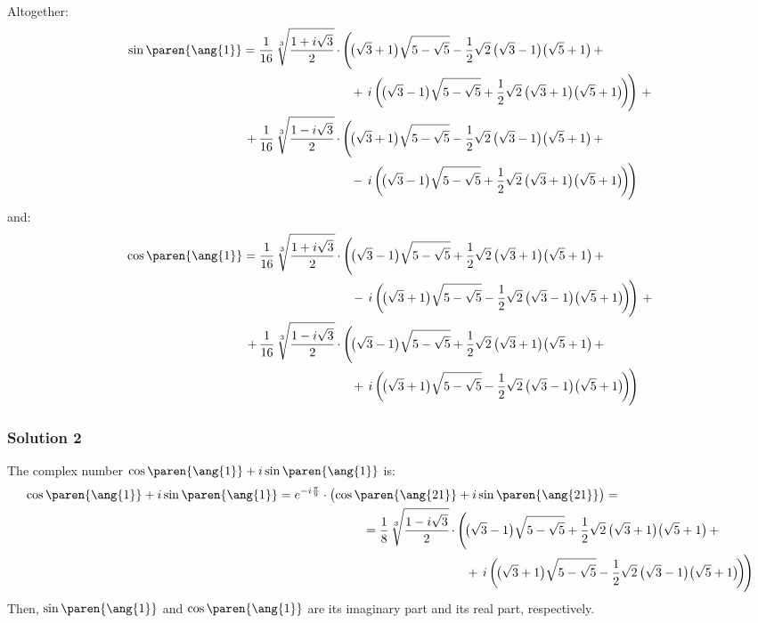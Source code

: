Altogether:
\begin{align*}
 \sin\paren{\ang{1}}
 = \frac{1}{16} \, \sqrt[3]{\frac{1 + i \sqrt{3}}{2}}
 \, \cdot \,
   &\Bigg( \!
     \big( \sqrt{3} + 1 \big) \sqrt{5 - \sqrt{5}}
     - \frac{1}{2} \sqrt{2} \, \big( \sqrt{3} - 1 \big) \big( \sqrt{5} + 1 \big) \, +
   \\
   &\,\,\,\,
     + \, i \, \bigg( \!
     \big( \sqrt{3} - 1 \big) \sqrt{5 - \sqrt{5}}
     + \frac{1}{2} \sqrt{2} \, \big( \sqrt{3} + 1 \big) \big( \sqrt{5} + 1 \big) \!
     \bigg) \!
   \Bigg) \,\, +
 \\
 + \, \frac{1}{16} \, \sqrt[3]{\frac{1 - i \sqrt{3}}{2}}
 \, \cdot \,
   &\Bigg( \!
     \big( \sqrt{3} + 1 \big) \sqrt{5 - \sqrt{5}}
     - \frac{1}{2} \sqrt{2} \, \big( \sqrt{3} - 1 \big) \big( \sqrt{5} + 1 \big) \, +
   \\
   &\,\,\,\,
     - \, i \, \bigg( \!
     \big( \sqrt{3} - 1 \big) \sqrt{5 - \sqrt{5}}
     + \frac{1}{2} \sqrt{2} \, \big( \sqrt{3} + 1 \big) \big( \sqrt{5} + 1 \big) \!
     \bigg) \!
   \Bigg)
\end{align*}
and:
\begin{align*}
 \cos\paren{\ang{1}}
 = \frac{1}{16} \, \sqrt[3]{\frac{1 + i \sqrt{3}}{2}}
 \, \cdot \,
   &\Bigg( \!
     \big( \sqrt{3} - 1 \big) \sqrt{5 - \sqrt{5}}
     + \frac{1}{2} \sqrt{2} \, \big( \sqrt{3} + 1 \big) \big( \sqrt{5} + 1 \big) \, +
   \\
   &\,\,\,\,
     - \, i \, \bigg( \!
     \big( \sqrt{3} + 1 \big) \sqrt{5 - \sqrt{5}}
     - \frac{1}{2} \sqrt{2} \, \big( \sqrt{3} - 1 \big) \big( \sqrt{5} + 1 \big) \!
     \bigg) \!
   \Bigg) \,\, +
 \\
 + \, \frac{1}{16} \, \sqrt[3]{\frac{1 - i \sqrt{3}}{2}}
 \, \cdot \,
   &\Bigg( \!
     \big( \sqrt{3} - 1 \big) \sqrt{5 - \sqrt{5}}
     + \frac{1}{2} \sqrt{2} \, \big( \sqrt{3} + 1 \big) \big( \sqrt{5} + 1 \big) \, +
   \\
   &\,\,\,\,
     + \, i \, \bigg( \!
     \big( \sqrt{3} + 1 \big) \sqrt{5 - \sqrt{5}}
     - \frac{1}{2} \sqrt{2} \, \big( \sqrt{3} - 1 \big) \big( \sqrt{5} + 1 \big) \!
     \bigg) \!
   \Bigg)
\end{align*}

\subsubsection*{Solution 2}
The complex number $\cos\paren{\ang{1}} + i \sin\paren{\ang{1}}$ is:
\begin{align*}
 \cos\paren{\ang{1}} + i \sin\paren{\ang{1}}
 = e^{-i \frac{\pi}{9}}
 \cdot \big( \! \cos\paren{\ang{21}} &+ i \sin\paren{\ang{21}} \big) = \\
 = \frac{1}{8} \, \sqrt[3]{\frac{1 - i \sqrt{3}}{2}}
 \, \cdot \,
   &\Bigg( \!
     \big( \sqrt{3} - 1 \big) \sqrt{5 - \sqrt{5}}
     + \frac{1}{2} \sqrt{2} \, \big( \sqrt{3} + 1 \big) \big( \sqrt{5} + 1 \big) \, +
   \\
   &\,\,\,\,
     + \, i \, \bigg( \!
     \big( \sqrt{3} + 1 \big) \sqrt{5 - \sqrt{5}}
     - \frac{1}{2} \sqrt{2} \, \big( \sqrt{3} - 1 \big) \big( \sqrt{5} + 1 \big) \!
     \bigg) \!
   \Bigg)
\end{align*}
Then, $\sin\paren{\ang{1}}$ and $\cos\paren{\ang{1}}$
are its imaginary part and its real part, respectively.
